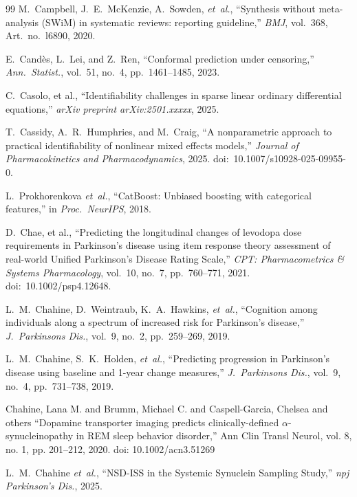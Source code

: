 \begin{thebibliography}{99}
M.~Campbell, J.~E.~McKenzie, A.~Sowden, \textit{et~al.}, ``Synthesis without meta-analysis (SWiM) in systematic reviews: reporting guideline,'' \textit{BMJ}, vol.~368, Art.\ no.~l6890, 2020.

E.~Cand\`{e}s, L.~Lei, and Z.~Ren, ``Conformal prediction under censoring,'' \textit{Ann.\ Statist.}, vol.~51, no.~4, pp.~1461--1485, 2023.

C.~Casolo, et al., ``Identifiability challenges in sparse linear ordinary differential equations,'' \textit{arXiv preprint arXiv:2501.xxxxx}, 2025.

T.~Cassidy, A.~R.~Humphries, and M.~Craig, ``A nonparametric approach to practical identifiability of nonlinear mixed effects models,'' \textit{Journal of Pharmacokinetics and Pharmacodynamics}, 2025. doi:~10.1007/s10928-025-09955-0.

L.~Prokhorenkova \textit{et~al.}, ``CatBoost: Unbiased boosting with categorical features,'' in \textit{Proc.\ NeurIPS}, 2018.

D.~Chae, et al., ``Predicting the longitudinal changes of levodopa dose requirements in Parkinson's disease using item response theory assessment of real-world Unified Parkinson's Disease Rating Scale,'' \textit{CPT: Pharmacometrics \& Systems Pharmacology}, vol.~10, no.~7, pp.~760--771, 2021. doi:~10.1002/psp4.12648.

L.~M.~Chahine, D.~Weintraub, K.~A.~Hawkins, \textit{et~al.}, ``Cognition among individuals along a spectrum of increased risk for Parkinson's disease,'' \textit{J.\ Parkinsons Dis.}, vol.~9, no.~2, pp.~259--269, 2019.

L.~M.~Chahine, S.~K.~Holden, \textit{et~al.}, ``Predicting progression in Parkinson's disease using baseline and 1-year change measures,'' \textit{J.\ Parkinsons Dis.}, vol.~9, no.~4, pp.~731--738, 2019.

 Chahine, Lana M. and Brumm, Michael C. and Caspell-Garcia, Chelsea and others ``Dopamine transporter imaging predicts clinically-defined $\alpha$-synucleinopathy in REM sleep behavior disorder,'' Ann Clin Transl Neurol, vol. 8, no. 1, pp. 201--212, 2020. doi: 10.1002/acn3.51269

L.~M.~Chahine \textit{et~al.}, ``NSD-ISS in the Systemic Synuclein Sampling Study,'' \textit{npj Parkinson's Dis.}, 2025.


\end{thebibliography}
